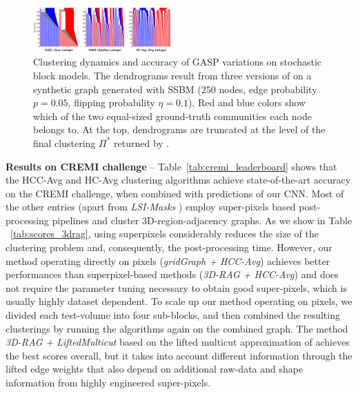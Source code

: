 \begin{figure}
\centering
\includegraphics[width=0.48\textwidth,trim=0 10 60 0, clip]{./figs/dendrograms/new_agglo_order.png} %
\caption{Clustering dynamics and accuracy of GASP variations on stochastic block models. The dendrograms result from three versions of \algname{} on a synthetic graph generated with SSBM ($250$ nodes, edge probability $p=0.05$, flipping probability $\eta=0.1$).  Red and blue colors show which of the two equal-sized ground-truth communities each node belongs to. At the top, dendrograms are truncated at the level of the final clustering $\Pi^*$ returned by \algname{}. \label{fig:dendrograms}}
\end{figure}






\textbf{Results on CREMI challenge} -- 
Table~\ref{tab:cremi_leaderboard} shows that the HCC-Avg and HC-Avg clustering algorithms achieve state-of-the-art accuracy on the CREMI challenge, when combined with predictions of our CNN.
Most of the other entries (apart from \emph{LSI-Masks} \cite{bailoni2020proposal}) employ super-pixels based post-processing pipelines and cluster 3D-region-adjacency graphs. As we show in Table ~\ref{tab:scores_3drag}, using superpixels considerably reduces the size of the clustering problem and, consequently, the post-processing time. 
However, our method operating directly on pixels (\emph{gridGraph + HCC-Avg}) achieves better performances than superpixel-based methods (\emph{3D-RAG + HCC-Avg}) and does not require the parameter tuning necessary to obtain good super-pixels, which is usually highly dataset dependent.
To scale up our method operating on pixels, we divided each test-volume into four sub-blocks, and then combined the resulting clusterings by running the algorithms again on the combined graph.
The method \emph{3D-RAG + LiftedMulticut} based on the lifted multicut approximation of \cite{beier2017multicut} achieves the best scores overall, but it takes into account different information through the lifted edge weights that also depend on additional raw-data and shape information from highly engineered super-pixels. 


